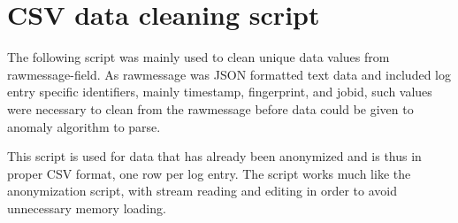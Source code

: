 \clearpage


\section{CSV data cleaning script}\label{sec:app-data-cleaning-script}

The following script was mainly used to
clean unique data values from rawmessage-field.
As rawmessage was JSON formatted text data
and included log entry specific identifiers,
mainly timestamp, fingerprint, and jobid,
such values were necessary to clean from the rawmessage
before data could be given to anomaly algorithm to parse.

This script is used for data
that has already been anonymized
and is thus in proper CSV format,
one row per log entry.
The script works much like the anonymization script,
with stream reading and editing
in order to avoid unnecessary memory loading.

